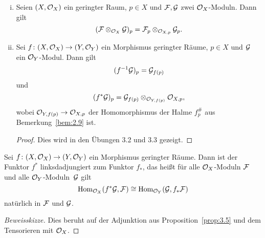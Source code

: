 \begin{lem}
	\begin{enumerate}[i)]
		\item Seien $(X,\mathcal{O}_X)$ ein geringter Raum, $p\in X$ und $\mathcal{F},\mathcal{G}$ zwei $\mathcal{O}_X$-Moduln. Dann gilt
		\[
			(\mathcal{F}\otimes_{\mathcal{O}_X}\mathcal{G})_p = \mathcal{F}_p \otimes_{\mathcal{O}_{X,p}} \mathcal{G}_p.
		\]
		\item Sei $f \colon (X, \mathcal{O}_X) \to (Y, \mathcal{O}_Y)$ ein Morphismus geringter Räume, $p \in X$ und $\mathcal{G}$ ein $\mathcal{O}_Y$-Modul. Dann gilt
		\[
			(f^{-1}\mathcal{G})_p = \mathcal{G}_{f(p)}
		\]
		und
		\[
			(f^*\mathcal{G})_p = \mathcal{G}_{f(p)}\otimes_{\mathcal{O}_{Y,f(p)}}\mathcal{O}_{X,p},
		\]
		wobei $\mathcal{O}_{Y,f(p)}\to \mathcal{O}_{X,p}$ der Homomorphismus der Halme $f^{\#}_p$ aus Bemerkung~\ref{bem:2.9} ist.
		\begin{proof}
			Dies wird in den Übungen 3.2 und 3.3 gezeigt.
		\end{proof}
	\end{enumerate}
\end{lem}

\begin{lem}
	Sei $f\colon (X,\mathcal{O}_X) \to (Y,\mathcal{O}_Y)$ ein Morphismus geringter Räume. Dann ist der Funktor $f^*$ linksdadjungiert zum Funktor $f_*$, das heißt für alle $\mathcal{O}_X$-Moduln $\mathcal{F}$ und alle $\mathcal{O}_Y$-Moduln~$\mathcal{G}$ gilt
	\[
		\operatorname{Hom}_{\mathcal{O}_X}(f^*\mathcal{G},\mathcal{F}) \cong \operatorname{Hom}_{\mathcal{O}_Y}(\mathcal{G},f_*\mathcal{F})
	\]
	natürlich in $\mathcal{F}$ und $\mathcal{G}$.
	\begin{proof}[Beweisskizze]
		Dies beruht auf der Adjunktion aus Proposition~\ref{prop:3.5} und dem Tensorieren mit $\mathcal{O}_X$.
	\end{proof}
\end{lem}
